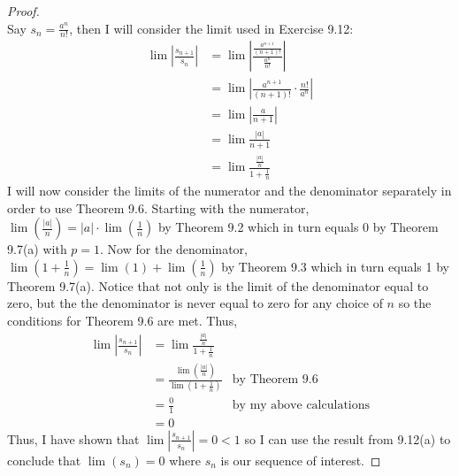 \documentclass[10pt,a4paper]{article}
\theoremstyle{definition}
\begin{document}
\begin{proof}{$ $}
\\Say $\displaystyle s_n = \frac{a^n}{n!}$, then I will consider the limit used in Exercise 9.12:
\begin{align*}
\lim \left|\frac{s_{n + 1}}{s_n}\right| &= \lim \left|\frac{\frac{a^{n + 1}}{(n + 1)!}}{\frac{a^n}{n!}}\right|\\
&= \lim \left|\frac{a^{n + 1}}{(n + 1)!} \cdot \frac{n!}{a^n}\right|\\
&= \lim \left|\frac{a}{n + 1}\right|\\
&= \lim \frac{|a|}{n + 1}\\
&= \lim \frac{\frac{|a|}{n}}{1 + \frac{1}{n}}
\end{align*}
I will now consider the limits of the numerator and the denominator separately in order to use Theorem 9.6. Starting with the numerator, $\displaystyle \lim\left(\frac{|a|}{n}\right) = |a|\cdot \lim\left(\frac{1}{n}\right)$ by Theorem 9.2 which in turn equals 0 by Theorem 9.7(a) with $p = 1$. Now for the denominator, $\lim\left(1 + \frac{1}{n}\right) = \lim(1) + \lim\left(\frac{1}{n}\right)$ by Theorem 9.3 which in turn equals 1 by Theorem 9.7(a). Notice that not only is the limit of the denominator equal to zero, but the the denominator is never equal to zero for any choice of $n$ so the conditions for Theorem 9.6 are met. Thus, 
\begin{align*}
\lim\left|\frac{s_{n+1}}{s_n}\right| &= \lim \frac{\frac{|a|}{n}}{1 + \frac{1}{n}}\\
&= \frac{\lim\left(\frac{|a|}{n}\right)}{\lim\left(1 + \frac{1}{n}\right)} &\text{by Theorem 9.6}\\
&= \frac{0}{1} &\text{by my above calculations}\\
&= 0
\end{align*}
Thus, I have shown that $\displaystyle \lim\left|\frac{s_{n+1}}{s_n}\right| = 0 < 1$ so I can use the result from 9.12(a) to conclude that $\lim(s_n) = 0$ where $s_n$ is our sequence of interest. 
\end{proof}
\end{document}
